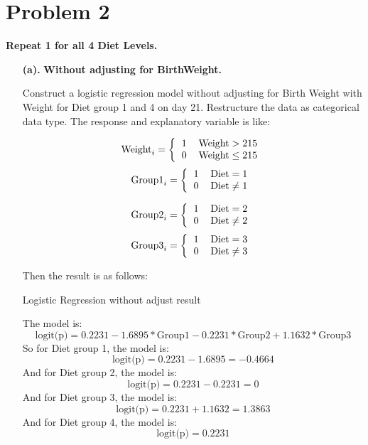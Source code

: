 \documentclass[10pt,letterpaper]{article}
\begin{document}
\section*{Problem 2}
\textbf{Repeat 1 for all 4 Diet Levels.}
\begin{enumerate}[leftmargin=0cm,itemindent=.5cm,labelwidth=\itemindent,labelsep=0cm,align=left]
\item[\textbf{(a).} ] \textbf{Without adjusting for BirthWeight.}

Construct a logistic regression model without adjusting for Birth Weight with Weight for Diet group 1 and 4 on day 21. Restructure the data as categorical data type. The response and explanatory variable is like:\\
\begin{multicols}{2}
\[\text{Weight}_i=  
\left \{
  \begin{tabular}{cc}
  1 & $\text{Weight}>215$\\
  0 & $\text{Weight} \leq 215$ \\
  \end{tabular}
\right.
\]
\[\text{Group1}_i=  
\left \{
  \begin{tabular}{cc}
  1 &  $\text{Diet} = 1$\\
  0 &  $\text{Diet} \neq 1$\\
  \end{tabular}
\right.
\]

\[\text{Group2}_i=  
\left \{
  \begin{tabular}{cc}
  1 &  $\text{Diet} = 2$\\
  0 &  $\text{Diet} \neq 2$\\
  \end{tabular}
\right.
\]
\[\text{Group3}_i=  
\left \{
  \begin{tabular}{cc}
  1 &  $\text{Diet} = 3$\\
  0 &  $\text{Diet} \neq 3$ \\
  \end{tabular}
\right.
\]
\end{multicols}
Then the result is as follows:
\begin{center}
Logistic Regression without adjust result

\end{center}
The model is:
\[ \text{logit(p)} = 0.2231-1.6895*\text{Group1}-0.2231*\text{Group2}+1.1632*\text{Group3}\]
So for Diet group 1, the model is:
\[ \text{logit(p)} = 0.2231-1.6895=-0.4664\]
And for Diet group 2, the model is:
\[\text{logit(p)} = 0.2231-0.2231=0\]
And for Diet group 3, the model is:
\[\text{logit(p)} = 0.2231+1.1632=1.3863\]
And for Diet group 4, the model is:
\[\text{logit(p)} = 0.2231\]


\end{enumerate}
\end{document}
